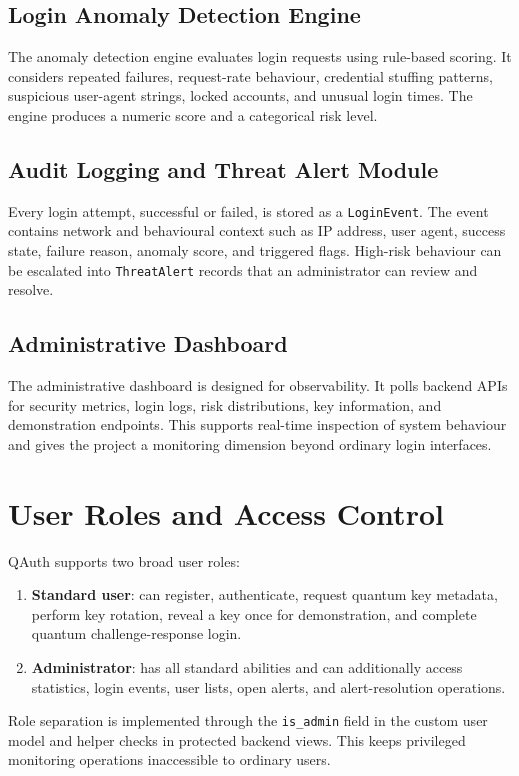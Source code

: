 \documentclass[12pt,a4paper]{report}
\begin{document}
\subsection{Login Anomaly Detection Engine}
The anomaly detection engine evaluates login requests using rule-based scoring. It considers repeated failures, request-rate behaviour, credential stuffing patterns, suspicious user-agent strings, locked accounts, and unusual login times. The engine produces a numeric score and a categorical risk level.

\subsection{Audit Logging and Threat Alert Module}
Every login attempt, successful or failed, is stored as a \texttt{LoginEvent}. The event contains network and behavioural context such as IP address, user agent, success state, failure reason, anomaly score, and triggered flags. High-risk behaviour can be escalated into \texttt{ThreatAlert} records that an administrator can review and resolve.

\subsection{Administrative Dashboard}
The administrative dashboard is designed for observability. It polls backend APIs for security metrics, login logs, risk distributions, key information, and demonstration endpoints. This supports real-time inspection of system behaviour and gives the project a monitoring dimension beyond ordinary login interfaces.

\section{User Roles and Access Control}
QAuth supports two broad user roles:

\begin{enumerate}
    \item \textbf{Standard user}: can register, authenticate, request quantum key metadata, perform key rotation, reveal a key once for demonstration, and complete quantum challenge-response login.
    \item \textbf{Administrator}: has all standard abilities and can additionally access statistics, login events, user lists, open alerts, and alert-resolution operations.
\end{enumerate}

Role separation is implemented through the \texttt{is\_admin} field in the custom user model and helper checks in protected backend views. This keeps privileged monitoring operations inaccessible to ordinary users.
\end{document}
